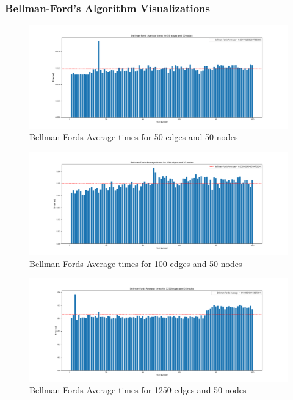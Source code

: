 \documentclass[12pt]{article}
\begin{document}
\subsubsection*{Bellman-Ford's Algorithm Visualizations}

\begin{figure}[H]
    \centering
    \includegraphics[width=\textwidth]{images/Bellman-Fords Average times for 50 edges and 50 nodes.png}
    \caption{Bellman-Fords Average times for 50 edges and 50 nodes}
\end{figure}

\begin{figure}[H]
    \centering
    \includegraphics[width=\textwidth]{images/Bellman-Fords Average times for 100 edges and 50 nodes.png}
    \caption{Bellman-Fords Average times for 100 edges and 50 nodes}
\end{figure}

\begin{figure}[H]
    \centering
    \includegraphics[width=\textwidth]{images/Bellman-Fords Average times for 1250 edges and 50 nodes.png}
    \caption{Bellman-Fords Average times for 1250 edges and 50 nodes}
\end{figure}
\end{document}
